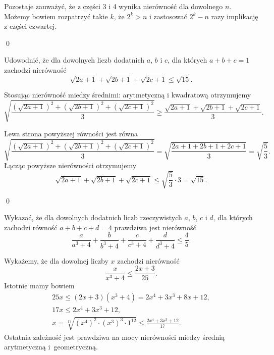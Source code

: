 \vspace{10px}

\noindent
Pozostaje zauważyć, że z części 3 i 4 wynika nierówność dla dowolnego $n$. Możemy bowiem rozpatrzyć takie $k$, że $2^k > n$ i zastosować $2^k - n$ razy implikację z części czwartej.

\qed

\vspace{10px}


\noindent
Udowodnić, że dla dowolnych liczb dodatnich $a$, $b$ i $c$, dla których $a + b + c = 1$ zachodzi nierówność
\[
    \sqrt{2a + 1} + \sqrt{2b + 1} + \sqrt{2c + 1} \leqslant \sqrt{15}.
\]

\newpage


\noindent
Stosując nierówność miedzy średnimi: arytmetyczną i kwadratową otrzymujemy
\[
    \sqrt{\frac{\left(\sqrt{2a + 1}\right)^2 + \left(\sqrt{2b + 1}\right)^2 + \left(\sqrt{2c + 1}\right)^2}{3}}
    \geqslant \frac{\sqrt{2a + 1} + \sqrt{2b + 1} + \sqrt{2c + 1}}{3}.
\]

\noindent
Lewa strona powyższej równości jest równa
\[
    \sqrt{\frac{\left(\sqrt{2a + 1}\right)^2 + \left(\sqrt{2b + 1}\right)^2 + \left(\sqrt{2c + 1}\right)^2}{3}} = \sqrt{\frac{2a + 1 + 2b + 1 + 2c + 1}{3}} = \sqrt{\frac{5}{3}}.
\]
Łącząc powyższe nierówności otrzymujemy
\[
    \sqrt{2a + 1} + \sqrt{2b + 1} + \sqrt{2c + 1} \leqslant \sqrt{\frac{5}{3}} \cdot 3 = \sqrt{15}.
\]

\qed


\noindent
Wykazać, że dla dowolnych dodatnich liczb rzeczywistych $a$, $b$, $c$ i $d$, dla których zachodzi równość ${a + b + c + d = 4}$ prawdziwa jest nierówność
\[
    \frac{a}{a^3 + 4} + \frac{b}{b^3 + 4} + \frac{c}{c^3 + 4} + \frac{d}{d^3 + 4} \leqslant \frac{4}{5}. 
\]


\noindent
Wykażemy, że dla dowolnej liczby $x$ zachodzi nierówność
\[
    \frac{x}{x^3 + 4} \leqslant \frac{2x + 3}{25}.
\]
Istotnie mamy bowiem
\begin{align*}
    25x \leqslant (2x + 3)(x^3 + 4) = 2x^4 + 3x^3 + 8x + 12, \\
    17x \leqslant 2x^4 + 3x^3 + 12,\\
    x = \sqrt[17]{\left(x^4\right)^2\cdot\left(x^3\right)^3\cdot1^{12}} \leqslant \frac{2x^4 + 3x^3 + 12}{17}.
\end{align*}
Ostatnia zależność jest prawdziwa na mocy nierówności miedzy średnią arytmetyczną i~geometryczną.


